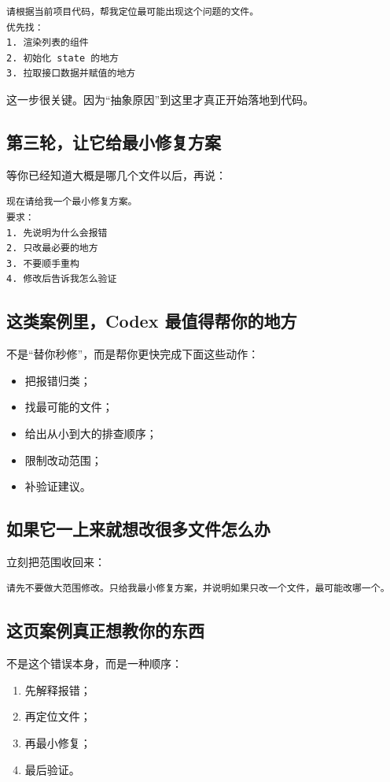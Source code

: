\documentclass[UTF8,a4paper,12pt]{ctexart}
\begin{document}
\begin{lstlisting}[style=prompt]
请根据当前项目代码，帮我定位最可能出现这个问题的文件。
优先找：
1. 渲染列表的组件
2. 初始化 state 的地方
3. 拉取接口数据并赋值的地方
\end{lstlisting}

这一步很关键。因为“抽象原因”到这里才真正开始落地到代码。

\subsection{第三轮，让它给最小修复方案}

等你已经知道大概是哪几个文件以后，再说：

\begin{lstlisting}[style=prompt]
现在请给我一个最小修复方案。
要求：
1. 先说明为什么会报错
2. 只改最必要的地方
3. 不要顺手重构
4. 修改后告诉我怎么验证
\end{lstlisting}

\subsection{这类案例里，Codex 最值得帮你的地方}

不是“替你秒修”，而是帮你更快完成下面这些动作：
\begin{itemize}
  \item 把报错归类；
  \item 找最可能的文件；
  \item 给出从小到大的排查顺序；
  \item 限制改动范围；
  \item 补验证建议。
\end{itemize}

\subsection{如果它一上来就想改很多文件怎么办}

立刻把范围收回来：

\begin{lstlisting}[style=prompt]
请先不要做大范围修改。只给我最小修复方案，并说明如果只改一个文件，最可能改哪一个。
\end{lstlisting}

\subsection{这页案例真正想教你的东西}

不是这个错误本身，而是一种顺序：
\begin{enumerate}
  \item 先解释报错；
  \item 再定位文件；
  \item 再最小修复；
  \item 最后验证。
\end{enumerate}
\end{document}
